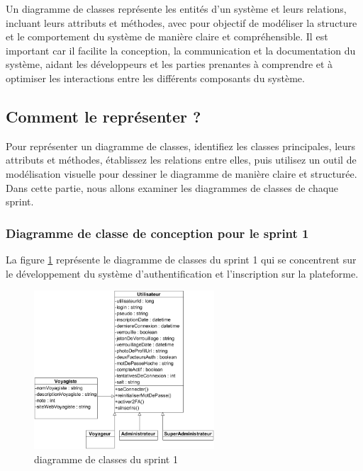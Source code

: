 \documentclass[12pt]{report}
\begin{document}
				\hspace{15pt} Un diagramme de classes représente les entités d'un système et leurs relations, incluant leurs attributs et méthodes, avec pour objectif de modéliser la structure et le comportement du système de manière claire et compréhensible. Il est important car il facilite la conception, la communication et la documentation du système, aidant les développeurs et les parties prenantes à comprendre et à optimiser les interactions entre les différents composants du système.
				
				\subsection{Comment le représenter ?}
				
				\hspace{15pt} Pour représenter un diagramme de classes, identifiez les classes principales, leurs attributs et méthodes, établissez les relations entre elles, puis utilisez un outil de modélisation visuelle pour dessiner le diagramme de manière claire et structurée.\\

				Dans cette partie, nous allons examiner les diagrammes de classes de chaque sprint.

				\subsubsection{Diagramme de classe de conception pour le sprint 1}

				\hspace{15pt} La figure \ref{fig:sprint1} représente le diagramme de classes du sprint 1 qui se concentrent sur le développement du système d’authentification et l’inscription sur la plateforme.

			\begin{figure}[h]
				\centering
				\includegraphics[width=0.6\textwidth]{sprint1.jpg}
				\caption{diagramme de classes du sprint 1}
				\label{fig:sprint1}
			\end{figure}
			\FloatBarrier
\end{document}
